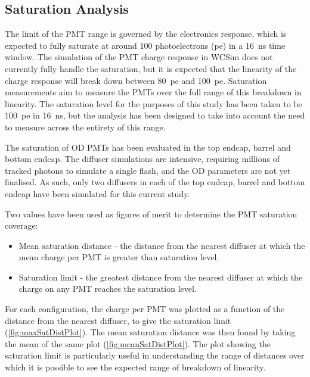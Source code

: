 \documentclass[a4paper,11pt]{article}
\begin{document}
\subsection{Saturation Analysis}\label{subsec:satStudy}

The limit of the PMT range is governed by the electronics response, which is expected to fully saturate at around 100 photoelectrons (pe) in a 16~ns time window. The simulation of the PMT charge response in WCSim does not currently fully handle the saturation, but it is expected that the linearity of the charge response will break down between 80~pe and 100~pe. Saturation measurements aim to measure the PMTs over the full range of this breakdown in linearity. The saturation level for the purposes of this study has been taken to be 100~pe in 16~ns, but the analysis has been designed to take into account the need to measure across the entirety of this range.

The saturation of OD PMTs has been evaluated in the top endcap, barrel and bottom endcap. The diffuser simulations are intensive, requiring millions of tracked photons to simulate a single flash, and the OD parameters are not yet finalised. As such, only two diffusers in each of the top endcap, barrel and bottom endcap have been simulated for this current study.

Two values have been used as figures of merit to determine the PMT saturation coverage:
\begin{itemize}
    \item Mean saturation distance - the distance from the nearest diffuser at which the mean charge per PMT is greater than saturation level.
    \item Saturation limit - the greatest distance from the nearest diffuser at which the charge on any PMT reaches the saturation level.
\end{itemize}

For each configuration, the charge per PMT was plotted as a function of the distance from the nearest diffuser, to give the saturation limit (\cref{fig:maxSatDistPlot}). The mean saturation distance was then found by taking the mean of the same plot (\cref{fig:meanSatDistPlot}). The plot showing the saturation limit is particularly useful in understanding the range of distances over which it is possible to see the expected range of breakdown of linearity.
\end{document}
